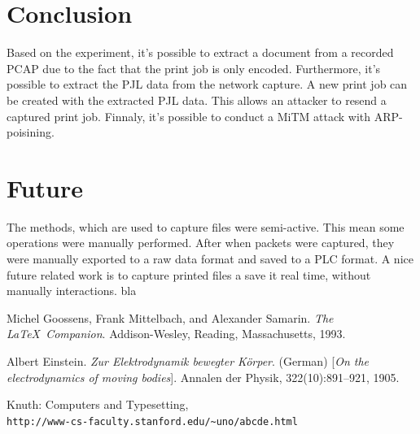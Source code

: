 \documentclass[a4paper]{article}
\begin{document}
\section{Conclusion} %
Based on the experiment, it's possible to extract a document from a recorded PCAP due to the fact that the print job is only encoded. Furthermore,  it's possible to extract the PJL data from the network capture. A new print job can be created with the extracted PJL data. This allows an attacker to resend a captured print job. Finnaly, it's possible to conduct a MiTM attack with ARP-poisining.


\section{Future}
The methods, which are used to capture files were semi-active. This mean some operations were manually performed. After when packets were captured, they were manually exported to a raw data format and saved to a PLC format. A nice future related work is to capture printed files a save it real time, without manually interactions. bla\cite{latexcompanion} 

\begin{thebibliography}{9}
Michel Goossens, Frank Mittelbach, and Alexander Samarin. 
\textit{The \LaTeX\ Companion}. 
Addison-Wesley, Reading, Massachusetts, 1993.
 
Albert Einstein. 
\textit{Zur Elektrodynamik bewegter K{\"o}rper}. (German) 
[\textit{On the electrodynamics of moving bodies}]. 
Annalen der Physik, 322(10):891–921, 1905.
 
Knuth: Computers and Typesetting,
\\\texttt{http://www-cs-faculty.stanford.edu/\~{}uno/abcde.html}
\end{thebibliography}


	
	
	
	
\end{document}
